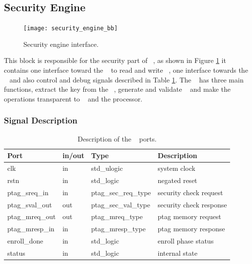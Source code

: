 \subsection{Security Engine}
\label{sec:secengine}

\begin{figure}[!ht]
    \centering
    \texttt{[image: security\_engine\_bb]}
    \caption{Security engine interface.  }
    \label{fig:sebb}
\end{figure}


This block is responsible for the security part of \cshia~,  as shown in Figure \ref{fig:sebb} it contains one interface toward the \ptagmem~ to read and write \ptags~, one interface towards the \handler~  and also control and debug signals described in Table \ref{table:seports}.  The \seceng~ has three main functions, extract the key from the \puf~, generate and validate \ptags~ and make the \ptagmem operations transparent to \handler~ and the processor.



\subsubsection{Signal Description}
\begin{table}[H]
    \centering
    \begin{tabular}{l l l l}
    
        \textbf{Port}   & \textbf{in/out} & \textbf{Type}        & \textbf{Description} 	\\ \hline \hline
        clk             & in              & std\_ulogic          & system clock         	\\ \hline
        rstn            & in              & std\_logic           & negated reset         	\\ \hline
        ptag\_sreq\_in  & in              & ptag\_sec\_req\_type & security check request    	\\ \hline
        ptag\_sval\_out & out             & ptag\_sec\_val\_type & security check response  	\\ \hline
        ptag\_mreq\_out & out             & ptag\_mreq\_type 	 & ptag memory  request    	\\ \hline
        ptag\_mresp\_in & in              & ptag\_mresp\_type 	 & ptag memory  response  	\\ \hline
        enroll\_done    & in              &  std\_logic      	 & enroll phase status  	\\ \hline
        status          & in              &  std\_logic      	 & internal state 	\\ \hline
        
    \end{tabular}
    \caption{Description of the \seceng~ ports.}
    \label{table:seports}
\end{table}




